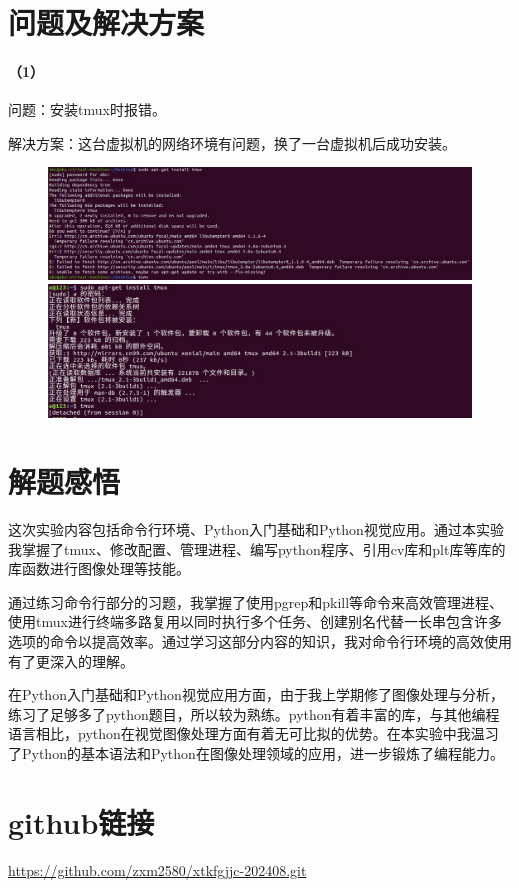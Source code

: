 \documentclass[a4paper, 12pt]{article}
\begin{document}
	\section{问题及解决方案}
	
	\paragraph{（1）}
	问题：安装tmux时报错。
	
	解决方案：这台虚拟机的网络环境有问题，换了一台虚拟机后成功安装。
	
	\begin{figure}[h]
		\centering
		\includegraphics[width=1\textwidth]{009.jpg}
		\includegraphics[width=1\textwidth]{011.jpg}
	\end{figure}
	
	\section{解题感悟}
	这次实验内容包括命令行环境、Python入门基础和Python视觉应用。通过本实验我掌握了tmux、修改配置、管理进程、编写python程序、引用cv库和plt库等库的库函数进行图像处理等技能。
	
	通过练习命令行部分的习题，我掌握了使用pgrep和pkill等命令来高效管理进程、使用tmux进行终端多路复用以同时执行多个任务、创建别名代替一长串包含许多选项的命令以提高效率。通过学习这部分内容的知识，我对命令行环境的高效使用有了更深入的理解。
	
	在Python入门基础和Python视觉应用方面，由于我上学期修了图像处理与分析，练习了足够多了python题目，所以较为熟练。python有着丰富的库，与其他编程语言相比，python在视觉图像处理方面有着无可比拟的优势。在本实验中我温习了Python的基本语法和Python在图像处理领域的应用，进一步锻炼了编程能力。
	
	\section{github链接}
	\underline{https://github.com/zxm2580/xtkfgjjc-202408.git}	
	
\end{document}

